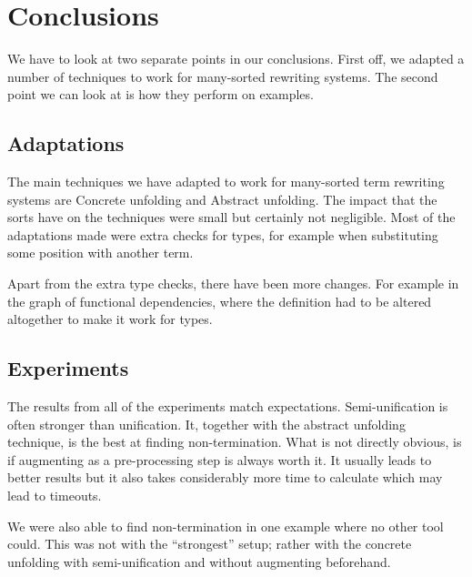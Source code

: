 \chapter{Conclusions}\label{conclusions}
We have to look at two separate points in our conclusions. First off, we adapted a number of techniques to work for many-sorted rewriting systems. The second point we can look at is how they perform on examples. 
\section{Adaptations}
The main techniques we have adapted to work for many-sorted term rewriting systems are Concrete unfolding and Abstract unfolding. The impact that the sorts have on the techniques were small but certainly not negligible. Most of the adaptations made were extra checks for types, for example when substituting some position with another term. 

Apart from the extra type checks, there have been more changes. For example in the graph of functional dependencies, where the definition had to be altered altogether to make it work for types.

\section{Experiments}
The results from all of the experiments match expectations. Semi-unification is often stronger than unification. It, together with the abstract unfolding technique, is the best at finding non-termination. What is not directly obvious, is if augmenting as a pre-processing step is always worth it. It usually leads to better results but it also takes considerably more time to calculate which may lead to timeouts. 

We were also able to find non-termination in one example where no other tool could. This was not with the ``strongest'' setup; rather with the concrete unfolding with semi-unification and without augmenting beforehand.